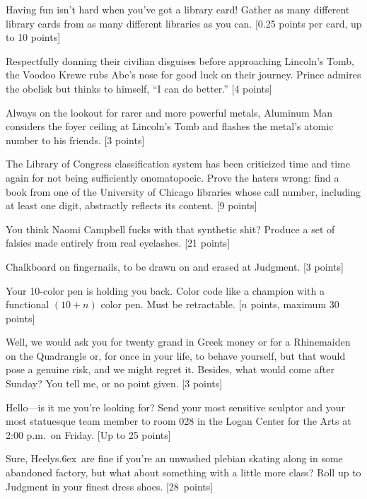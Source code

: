 \documentclass{book}
\def\tr{\raise.6ex\hbox{\scriptsize \textregistered}}
\begin{document}
\begin{list}{}{}
\item Having fun isn't hard when you've got a library card! Gather as many different library cards from as many different libraries as you can.  [0.25 points per card, up to 10 points]

\item Respectfully donning their civilian disguises before approaching Lincoln's Tomb, the Voodoo Krewe rubs Abe's nose for good luck on their journey.  Prince admires the obelisk but thinks to himself, ``I can do better.'' [4 points] 

\item Always on the lookout for rarer and more powerful metals, Aluminum Man considers the foyer ceiling at Lincoln's Tomb and flashes the metal's atomic number to his friends. [3 points]

\item The Library of Congress classification system has been criticized time and time again for not being sufficiently onomatopoeic. Prove the haters wrong: find a book from one of the University of Chicago libraries whose call number, including at least one digit, abstractly reflects its content.  [9 points]

\item You think Naomi Campbell fucks with that synthetic shit? Produce a set of falsies made entirely from real eyelashes. [21 points]

\item Chalkboard on fingernails, to be drawn on and erased at Judgment. [3 points]

\item Your 10-color pen is holding you back. Color code like a champion with a functional $(10+n)$ color pen. Must be retractable. [$n$ points, maximum 30 points]

\item Well, we would ask you for twenty grand in Greek money or for a Rhinemaiden on the Quadrangle or, for once in your life, to behave yourself, but that would pose a genuine risk, and we might regret it. Besides, what would come after Sunday? You tell me, or no point given. [3 points]

\item Hello---is it me you're looking for? Send your most sensitive sculptor and your most statuesque team member to room 028 in the Logan Center for the Arts at 2:00 p.m.\ on Friday. [Up to 25 points]


\item Sure, Heelys\tr\ are fine if you're an unwashed plebian skating along in some abandoned factory, but what about something with a little more class? Roll up to Judgment in your finest dress shoes. [28~points]




\end{list}
\end{document}
